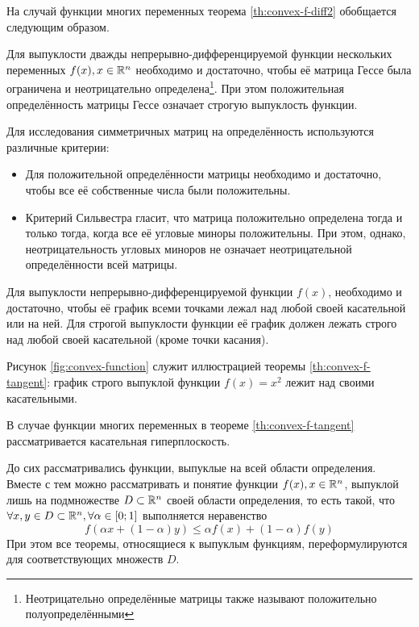 На случай функции многих переменных теорема \ref{th:convex-f-diff2}
обобщается следующим образом.
\begin{thm}
  \label{th:convex-f-hess}
  Для выпуклости дважды непрерывно-дифференцируемой функции нескольких
  переменных $f(x), x \in \mathbb{R}^n$ необходимо и достаточно, чтобы её
  матрица Гессе была ограничена и неотрицательно
  определена\footnote{Неотрицательно определённые матрицы также
    называют положительно полуопределёнными}. При этом положительная
  определённость матрицы Гессе означает строгую выпуклость функции.
\end{thm}
\clearpage
Для исследования симметричных матриц на определённость используются
различные критерии:
\begin{itemize}
\item Для положительной определённости матрицы необходимо и
  достаточно, чтобы все её собственные числа были положительны.
\item Критерий Сильвестра гласит, что матрица положительно определена
  тогда и только тогда, когда все её угловые миноры положительны. При
  этом, однако, неотрицательность угловых миноров не означает
  неотрицательной определённости всей матрицы.
\end{itemize}

\begin{thm}
  \label{th:convex-f-tangent}
  Для выпуклости непрерывно-дифференцируемой функции $f(x)$,
  необходимо и достаточно, чтобы её график всеми точками лежал над
  любой своей касательной или на ней. Для строгой выпуклости функции
  её график должен лежать строго над любой своей касательной (кроме
  точки касания).
\end{thm}
Рисунок \ref{fig:convex-function} служит иллюстрацией теоремы
\ref{th:convex-f-tangent}: график строго выпуклой функции $f(x) = x^2$
лежит над своими касательными.

В случае функции многих переменных в теореме \ref{th:convex-f-tangent}
рассматривается касательная гиперплоскость.

\begin{rem}
  До сих рассматривались функции, выпуклые на всей области
  определения. Вместе с тем можно рассматривать и понятие функции
  $f(x), x \in \mathbb{R}^n$, выпуклой лишь на подмножестве $D \subset
  \mathbb{R}^n$ своей области определения, то есть такой, что $\forall x,
  y \in D\subset \mathbb{R}^n, \forall \alpha \in [0;1]$ выполняется
  неравенство
  \begin{equation*}
    f(\alpha x + (1-\alpha)y) \leq \alpha f(x) + (1-\alpha) f(y)
  \end{equation*}
  При этом все теоремы, относящиеся к выпуклым функциям,
  переформулируются для соответствующих множеств $D$.
\end{rem}

